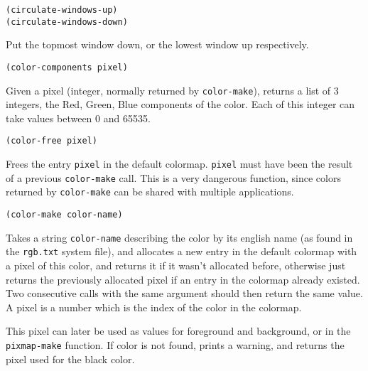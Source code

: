         
{\usagefont\begin{verbatim}
(circulate-windows-up)
(circulate-windows-down)
\end{verbatim}}\usageupspace

Put the topmost window down, or the lowest window up respectively.

        
{\usagefont\begin{verbatim}
(color-components pixel)
\end{verbatim}}\usageupspace

Given a pixel (integer, normally returned by \verb|color-make|), returns a
list of 3 integers, the Red, Green, Blue components of the color. Each of this
integer can take values between 0 and 65535.

        
{\usagefont\begin{verbatim}
(color-free pixel)
\end{verbatim}}\usageupspace

Frees the entry \verb|pixel| in the default colormap. \verb|pixel| must have
been the result of a previous \verb|color-make| call. This is a very dangerous
function, since colors returned by \verb|color-make| can be shared with
multiple applications.

        
{\usagefont\begin{verbatim}
(color-make color-name)
\end{verbatim}}\usageupspace

Takes a string \verb"color-name" describing the color by its english name (as
found in the \verb"rgb.txt" system file), and allocates a new entry in the
default colormap with a pixel of this color, and returns it if it wasn't
allocated before, otherwise just returns the previously allocated pixel if an
entry in the colormap already existed. Two consecutive calls with the same
argument should then return the same value. A pixel is a number which is the
index of the color in the colormap.

This pixel can later be used as values for foreground and
background, or in the \verb"pixmap-make" function.  If color is not found,
prints a warning, and returns the pixel used for the black color.

